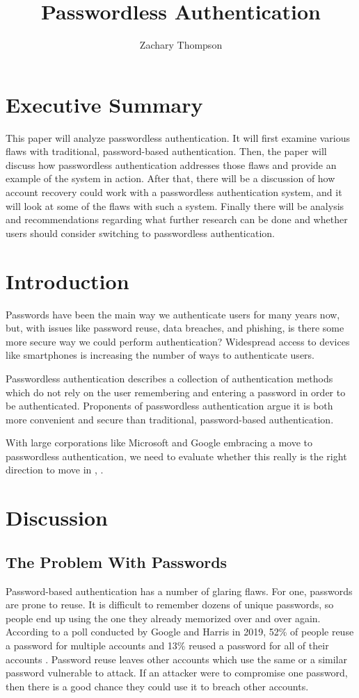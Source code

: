 \documentclass[12pt, letterpaper]{article}
\title{Passwordless Authentication}
\author{Zachary Thompson}
\begin{document}
\maketitle

\section{Executive Summary}
This paper will analyze passwordless authentication.
It will first examine various flaws with traditional, password-based authentication.
Then, the paper will discuss how passwordless authentication addresses those flaws and provide an example of the system in action.
After that, there will be a discussion of how account recovery could work with a passwordless authentication system, and it will look at some of the flaws with such a system.
Finally there will be analysis and recommendations regarding what further research can be done and whether users should consider switching to passwordless authentication.


\newpage
\section{Introduction}
Passwords have been the main way we authenticate users for many years now, but, with issues like password reuse, data breaches, and phishing, is there some more secure way we could perform authentication?
Widespread access to devices like smartphones is increasing the number of ways to authenticate users.

Passwordless authentication describes a collection of authentication methods which do not rely on the user remembering and entering a password in order to be authenticated.
Proponents of passwordless authentication argue it is both more convenient and secure than traditional, password-based authentication.

With large corporations like Microsoft and Google embracing a move to passwordless authentication, we need to evaluate whether this really is the right direction to move in \parencite{msftpaswdless}, \parencite{googpaswdless}.

\newpage
\section{Discussion}

\subsection{The Problem With Passwords}
Password-based authentication has a number of glaring flaws.
For one, passwords are prone to reuse.
It is difficult to remember dozens of unique passwords, so people end up using the one they already memorized over and over again.
According to a poll conducted by Google and Harris in 2019, 52\% of people reuse a password for multiple accounts and 13\% reused a password for all of their accounts \parencite{googleharris2019poll}.
Password reuse leaves other accounts which use the same or a similar password vulnerable to attack.
If an attacker were to compromise one password, then there is a good chance they could use it to breach other accounts.
\end{document}
